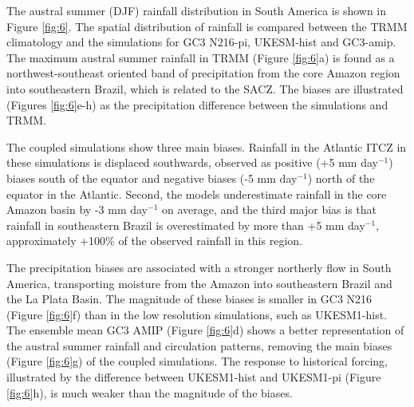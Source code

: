   The austral summer (DJF) rainfall distribution in South America is shown in Figure \ref{fig:6}. The spatial distribution of rainfall is compared between the TRMM climatology and the simulations for GC3 N216-pi, UKESM-hist and GC3-amip. 
The maximum austral summer rainfall in TRMM
(Figure \ref{fig:6}a) is found as a northwest-southeast oriented band of precipitation from the core Amazon region into southeastern Brazil, which is related to the SACZ.
The biases are illustrated (Figures \ref{fig:6}e-h) as the precipitation difference between the simulations and TRMM.
 
 

   The coupled simulations show three main biases.
Rainfall in the Atlantic ITCZ in these simulations is displaced southwards, observed as positive (+5 mm day$^{-1}$) biases south of the equator and negative biases (-5 mm day$^{-1}$) north of the equator in the Atlantic.
Second, the models underestimate rainfall in the core Amazon basin by -3 mm day$^{-1}$ on average, and the third major bias is that rainfall in southeastern Brazil is overestimated by more than +5 mm day$^{-1}$, approximately +100\% of the observed rainfall in this region.  

 The precipitation biases are associated with a stronger northerly flow in South America, transporting moisture from the Amazon into southeastern Brazil and the La Plata Basin.   
The magnitude of these biases is smaller in GC3 N216 (Figure \ref{fig:6}f) than in the low resolution simulations, such as UKESM1-hist.   The ensemble mean GC3 AMIP (Figure \ref{fig:6}d) shows a better representation of the austral summer rainfall and circulation patterns, removing the main biases (Figure \ref{fig:6}g) of the coupled simulations.   
The response to historical forcing, illustrated by the difference between UKESM1-hist and UKESM1-pi (Figure \ref{fig:6}h), is much weaker than the magnitude of the biases.


